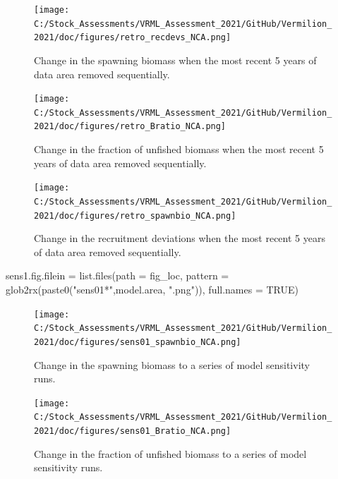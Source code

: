 \documentclass[
  english,
  a4paper,
]{article}
\newenvironment{Shaded}{\begin{snugshade}}{\end{snugshade}}
\newcommand{\AttributeTok}[1]{\textcolor[rgb]{0.77,0.63,0.00}{#1}}
\newcommand{\ConstantTok}[1]{\textcolor[rgb]{0.00,0.00,0.00}{#1}}
\newcommand{\FunctionTok}[1]{\textcolor[rgb]{0.00,0.00,0.00}{#1}}
\newcommand{\NormalTok}[1]{#1}
\newcommand{\OtherTok}[1]{\textcolor[rgb]{0.56,0.35,0.01}{#1}}
\newcommand{\StringTok}[1]{\textcolor[rgb]{0.31,0.60,0.02}{#1}}
\begin{document}
\begin{figure}
\centering
\texttt{[image: C:/Stock\_Assessments/VRML\_Assessment\_2021/GitHub/Vermilion\_2021/doc/figures/retro\_recdevs\_NCA.png]}
\caption{Change in the spawning biomass when the most recent 5 years of data area removed sequentially.\label{fig:retro-spawnb}}
\end{figure}

\begin{figure}
\centering
\texttt{[image: C:/Stock\_Assessments/VRML\_Assessment\_2021/GitHub/Vermilion\_2021/doc/figures/retro\_Bratio\_NCA.png]}
\caption{Change in the fraction of unfished biomass when the most recent 5 years of data area removed sequentially.\label{fig:retro-bratio}}
\end{figure}

\begin{figure}
\centering
\texttt{[image: C:/Stock\_Assessments/VRML\_Assessment\_2021/GitHub/Vermilion\_2021/doc/figures/retro\_spawnbio\_NCA.png]}
\caption{Change in the recruitment deviations when the most recent 5 years of data area removed sequentially.\label{fig:retro-recdev}}
\end{figure}

\begin{Shaded}
\begin{Highlighting}[]
\NormalTok{sens1.fig.filein }\OtherTok{=} \FunctionTok{list.files}\NormalTok{(}\AttributeTok{path =}\NormalTok{ fig\_loc,  }
                  \AttributeTok{pattern =} \FunctionTok{glob2rx}\NormalTok{(}\FunctionTok{paste0}\NormalTok{(}\StringTok{"sens01*"}\NormalTok{,model.area, }\StringTok{".png"}\NormalTok{)), }
                  \AttributeTok{full.names =} \ConstantTok{TRUE}\NormalTok{)}
\end{Highlighting}
\end{Shaded}

\begin{figure}
\centering
\texttt{[image: C:/Stock\_Assessments/VRML\_Assessment\_2021/GitHub/Vermilion\_2021/doc/figures/sens01\_spawnbio\_NCA.png]}
\caption{Change in the spawning biomass to a series of model sensitivity runs.\label{fig:sens1-spawnb}}
\end{figure}

\begin{figure}
\centering
\texttt{[image: C:/Stock\_Assessments/VRML\_Assessment\_2021/GitHub/Vermilion\_2021/doc/figures/sens01\_Bratio\_NCA.png]}
\caption{Change in the fraction of unfished biomass to a series of model sensitivity runs.\label{fig:sens1-bratio}}
\end{figure}
\end{document}
